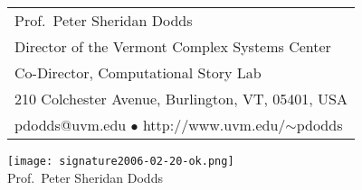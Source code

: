 \documentclass[11pt]{article}
\begin{document}
\sffamily 


{ \small
\begin{tabular}[b]{l}
Prof.\ Peter Sheridan Dodds\\
Director of the Vermont Complex Systems Center\\
Co-Director, Computational Story Lab\\
210 Colchester Avenue, Burlington, VT, 05401, USA\\
pdodds@uvm.edu
$\bullet$
http://www.uvm.edu/{$\sim$}pdodds
\end{tabular}
}


\bigskip
\bigskip



\texttt{[image: signature2006-02-20-ok.png]}\\
Prof.\ Peter Sheridan Dodds



\end{document}
